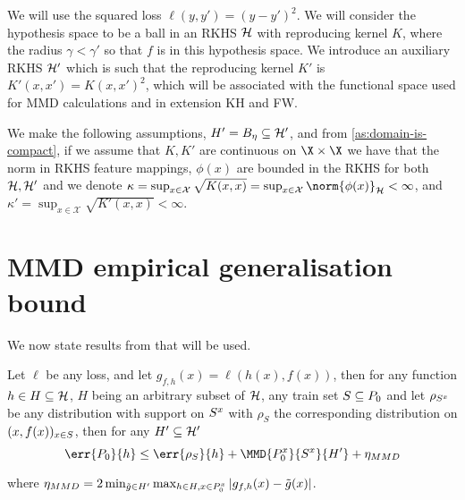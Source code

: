 We will use the squared loss \(\ell(y, y') = (y - y')^{2}\). We will consider
the hypothesis space to be a ball in an RKHS \(\mathcal{H}\) with reproducing
kernel \(K\), where the radius \(\gamma < \gamma'\) so that \(f\) is in this
hypothesis space. We introduce an auxiliary RKHS \(\mathcal{H}'\) which is such
that the reproducing kernel \(K'\) is \(K'(x, x') = K(x, x')^{2}\), which will
be associated with the functional space used for MMD calculations and in
extension KH and FW.

We make the following assumptions, \(H' = B_{\eta} \subseteq \mathcal{H}'\), and
from \ref{as:domain-is-compact}, if we assume that \(K, K'\) are continuous on
\(\X \times \X\) we have that the norm in RKHS feature mappings, \(\phi(x)\) are bounded in the RKHS for both
\(\mathcal{H}, \mathcal{H}'\) and we denote \(\kappa = \sup_{x \in \mathcal{X}}\sqrt{K(x, x)} =
\sup_{x \in \mathcal{X}}\norm{\phi(x)}_{\rkhs{H}} < \infty\), and \(\kappa' = \sup_{x \in \mathcal{X}}\sqrt{K'(x, x)} < \infty\).

\section{MMD empirical generalisation bound}
We now state results from \cite{viering17_nuclear_discr_activ_learn} that will be
used.
\begin{theorem}
  \label{th:mmd-emp-bound}
  Let \(\ell\) be any loss, and let \(g_{f, h}(x) = \ell(h(x), f(x))\), then for
  any function \(h \in H \subseteq \mathcal{H}\), \(H\) being an arbitrary subset of \(\mathcal{H}\), any train set
  \(S \subseteq P_{0}\) and let \(\rho_{S^x}\) be any distribution with
  support on \(S^x\) with \(\rho_{S}\) the corresponding distribution on
  \((x, f(x))_{x \in S}\), then for any \(H' \subseteq \mathcal{H}'\)
  \begin{equation}
    \label{eq:MMD-gen-bound}
    \err{\poolset_{0}}{h} \leq \err{\rho_{\trainset}}{h} + \MMD{\poolsetx_{0}}{\trainsetx}{H'} + \eta_{MMD}
  \end{equation}
\end{theorem}
where \(\eta_{MMD} = 2 \min_{\tilde{g} \in H'} \max_{h \in H, x \in P^x_{0}} |g_{f, h}(x) - \tilde{g}(x)|\).

